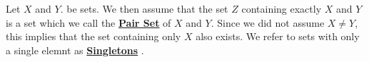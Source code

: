 \newcommand{\PairSet}[0]{\textbf{\hyperref[def:PairSet]{Pair Set}}\xspace}
\newcommand{\PairSets}[0]{\textbf{\hyperref[def:PairSet]{Pair Sets}}\xspace}
\newcommand{\Singleton}[0]{\textbf{\hyperref[def:PairSet]{Singleton}}\xspace}
\newcommand{\Singletons}[0]{\textbf{\hyperref[def:PairSet]{Singletons}\xspace}
}\begin{df}
\label{def:PairSet}

\rm
    Let $X$ and $Y$. be sets. 
    We then assume that the set $Z$ 
    containing exactly $X$ and $Y$ is a 
    set which we call the \PairSet of $X$ and $Y$. 
    Since we did not assume
    $X \neq Y$, this implies that the 
    set containing only $X$ also exists. 
    We refer to sets with only a single elemnt 
    as \Singletons.
\end{df}
